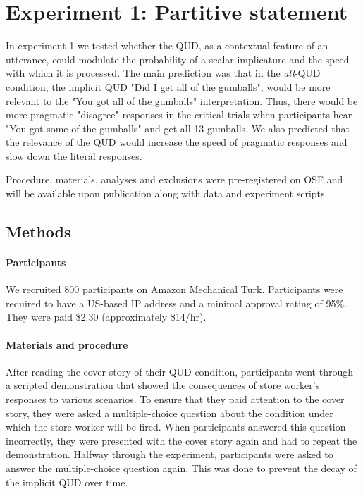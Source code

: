 \documentclass[10pt,letterpaper]{article}
\begin{document}
\section{Experiment 1: Partitive statement}

In experiment 1 we tested whether the QUD, as a contextual feature of an utterance, could modulate the probability of a scalar implicature and the speed with which it is processed. The main prediction was that in the \textit{all}-QUD condition, the implicit QUD "Did I get all of the gumballs", would be more relevant to the "You got all of the gumballs" interpretation. Thus, there would be more pragmatic "disagree" responses in the critical trials when participants hear "You got some of the gumballs" and get all 13 gumballs. We also predicted that the relevance of the QUD would increase the speed of pragmatic responses and slow down the literal responses.

Procedure, materials, analyses and exclusions were pre-registered on OSF and will be available upon publication along with data and experiment scripts.

\subsection{Methods}

\paragraph{Participants}
We recruited 800 participants on Amazon Mechanical Turk. Participants were required to have a US-based IP address and a minimal approval rating of 95\%. They were paid \$2.30 (approximately \$14/hr).

\paragraph{Materials and procedure}
After reading the cover story of their QUD condition, participants went through a scripted demonstration that showed the consequences of store worker's responses to various scenarios. To ensure that they paid attention to the cover story, they were asked a multiple-choice question about the condition under which the store worker will be fired. When participants answered this question incorrectly, they were presented with the cover story again and had to repeat the demonstration. Halfway through the experiment, participants were asked to answer the multiple-choice question again. This was done to prevent the decay of the implicit QUD over time.
\end{document}
